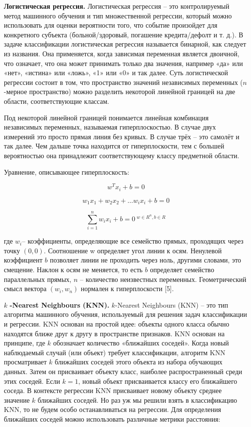 {\bfseries Логистическая регрессия.} Логистическая регрессия -- это
контролируемый метод машинного обучения и тип множественной регрессии,
который можно использовать для оценки вероятности того, что событие
произойдет для конкретного субъекта (больной/здоровый, погашение
кредита/дефолт и т. д.). В задаче классификации логистическая регрессия
называется бинарной, как следует из названия. Она применяется, когда
зависимая переменная является двоичной, что означает, что она может
принимать только два значения, например «да» или «нет», «истина» или
«ложь», «1» или «0» и так далее. Суть логистической регрессии состоит в
том, что пространство значений независимых переменных
($n$-мерное пространство) можно разделить
некоторой линейной границей на две области, соответствующие классам.

Под некоторой линейной границей понимается линейная комбинация
независимых переменных, называемая гиперплоскостью. В случае двух
измерений это просто прямая линия без кривых. В случае трёх -- это
самолёт и так далее. Чем дальше точка находится от гиперплоскости, тем с
большей вероятностью она принадлежит соответствующему классу предметной
области.

Уравнение, описывающее гиперплоскость:

\begin{equation}
	w^Tx_i+b=0
\end{equation}

\begin{equation}
w_1x_1+w_2x_2+\ldots w_ix_i+b=0
\end{equation}

\begin{equation}
\sum_{i=1}^n w_ix_i+b=0 \ ^{w\in R^n, b\in R}
\end{equation}


где $w_i$-- коэффициенты, определяющие все
семейство прямых, проходящих через точку $(0,0)$. Соотношение w определяет угол линии
к осям. Ненулевой коэффициент $ b$ позволяет линии не проходить через ноль, другими словами, это смещение.
Наклон к осям не меняется, то есть $ b$ определяет семейство параллельных прямых, $n $ -- количество неизвестных переменных.
Геометрический смысл вектора $(w_i, w_n)$ нормален к гиперплоскости {[}5{]}.

$k$ {\bfseries -Nearest Neighbours (KNN).}
$k$-Nearest Neighbours (KNN) -- это тип
алгоритма машинного обучения, используемый для решения задач
классификации и регрессии. KNN основан на простой идее: объекты одного
класса обычно находятся ближе друг к другу в пространстве признаков. KNN
основан на принципе, где $k$ обозначает
количество «ближайших соседей». Когда новый наблюдаемый случай (или
объект) требует классификации, алгоритм KNN просматривает $k$ ближайших соседей этого объекта из
набора обучающих данных. Затем он присваивает объекту класс, наиболее
распространенный среди этих соседей. Если $k=1$, новый объект присваивается классу его ближайшего соседа. В контексте регрессии KNN присваивает новому
объекту среднее значение $k$ ближайших
соседей. Но раз уж мы решили взять в классификацию KNN, то не будем
особо останавливаться на регрессии. Для определения ближайших соседей
можно использовать различные метрики расстояния:

